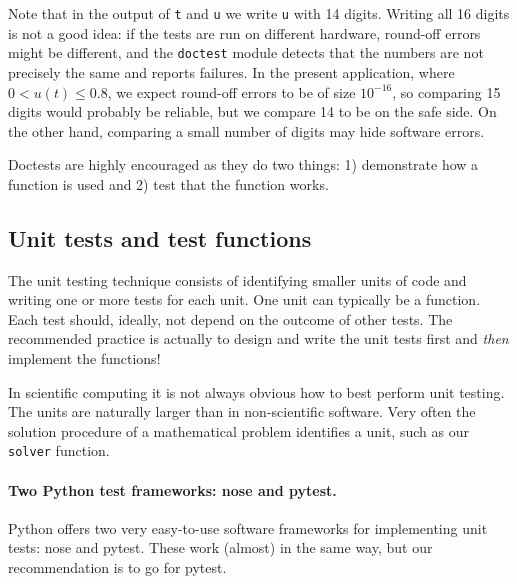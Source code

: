 \documentclass[graybox,sectrefs,envcountresetchap,open=right,final]{svmonodo}
\newenvironment{warning_mdfboxadmon}[1][]{
\begin{warning_mdfboxmdframed}[frametitle=#1]
}
{
\end{warning_mdfboxmdframed}
}
\begin{document}
\begin{warning_mdfboxadmon}
Note that in the output of \texttt{t} and \texttt{u} we write \texttt{u} with 14 digits.
Writing all 16 digits is not a good idea: if the tests are run on
different hardware, round-off errors might be different, and
the \texttt{doctest} module detects that the numbers are not precisely the same
and reports failures. In the present application, where $0 < u(t) \leq 0.8$,
we expect round-off errors to be of size $10^{-16}$, so comparing 15
digits would probably be reliable, but we compare 14 to be on the
safe side. On the other hand, comparing a small number of digits may
hide software errors.
\end{warning_mdfboxadmon} %



Doctests are highly encouraged as they do two things: 1) demonstrate
how a function is used and 2) test that the function works.

\subsection{Unit tests and test functions}
\label{softeng1:verify:pytest}


The unit testing technique consists of identifying smaller units
of code and writing one or more tests for
each unit. One unit can typically be a function.
Each test should, ideally, not depend on the outcome of
other tests. The recommended practice is actually to
design and write the unit tests first and \emph{then} implement the functions!

In scientific computing it is not always obvious how to best perform
unit testing. The units are naturally larger than in non-scientific
software. Very often the solution procedure of a mathematical problem
identifies a unit, such as our \texttt{solver} function.


\paragraph{Two Python test frameworks: nose and pytest.}
Python offers two very easy-to-use software frameworks for implementing
unit tests: nose and pytest. These work (almost) in the same way,
but our recommendation is to go for pytest.
\end{document}
